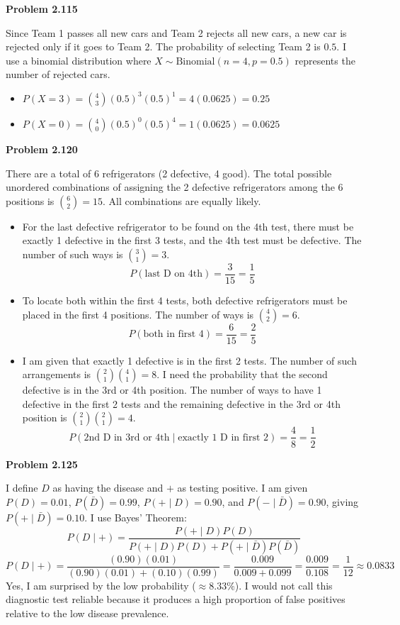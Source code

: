 \documentclass[11pt]{article}
\begin{document}
\textbf{\large Problem 2.115}

Since Team 1 passes all new cars and Team 2 rejects all new cars, a new car is rejected only if it goes to Team 2. The probability of selecting Team 2 is $0.5$. I use a binomial distribution where $X \sim \text{Binomial}(n=4, p=0.5)$ represents the number of rejected cars.
\begin{itemize}
    \item[\textbf{a)}] $P(X = 3) = \binom{4}{3} (0.5)^3 (0.5)^1 = 4(0.0625) = 0.25$
    \item[\textbf{b)}] $P(X = 0) = \binom{4}{0} (0.5)^0 (0.5)^4 = 1(0.0625) = 0.0625$
\end{itemize}

\textbf{\large Problem 2.120}

There are a total of 6 refrigerators (2 defective, 4 good). The total possible unordered combinations of assigning the 2 defective refrigerators among the 6 positions is $\binom{6}{2} = 15$. All combinations are equally likely.
\begin{itemize}
    \item[\textbf{a)}] For the last defective refrigerator to be found on the 4th test, there must be exactly 1 defective in the first 3 tests, and the 4th test must be defective. The number of such ways is $\binom{3}{1} = 3$. 
    \[
    P(\text{last D on 4th}) = \frac{3}{15} = \frac{1}{5}
    \]
    \item[\textbf{b)}] To locate both within the first 4 tests, both defective refrigerators must be placed in the first 4 positions. The number of ways is $\binom{4}{2} = 6$.
    \[
    P(\text{both in first 4}) = \frac{6}{15} = \frac{2}{5}
    \]
    \item[\textbf{c)}] I am given that exactly 1 defective is in the first 2 tests. The number of such arrangements is $\binom{2}{1}\binom{4}{1} = 8$. I need the probability that the second defective is in the 3rd or 4th position. The number of ways to have 1 defective in the first 2 tests and the remaining defective in the 3rd or 4th position is $\binom{2}{1}\binom{2}{1} = 4$.
    \[
    P(\text{2nd D in 3rd or 4th} \mid \text{exactly 1 D in first 2}) = \frac{4}{8} = \frac{1}{2}
    \]
\end{itemize}

\textbf{\large Problem 2.125}

I define $D$ as having the disease and $+$ as testing positive. I am given $P(D) = 0.01$, $P(\bar{D}) = 0.99$, $P(+ \mid D) = 0.90$, and $P(- \mid \bar{D}) = 0.90$, giving $P(+ \mid \bar{D}) = 0.10$. I use Bayes' Theorem:
\[
P(D \mid +) = \frac{P(+ \mid D)P(D)}{P(+ \mid D)P(D) + P(+ \mid \bar{D})P(\bar{D})}
\]
\[
P(D \mid +) = \frac{(0.90)(0.01)}{(0.90)(0.01) + (0.10)(0.99)} = \frac{0.009}{0.009 + 0.099} = \frac{0.009}{0.108} = \frac{1}{12} \approx 0.0833
\]
Yes, I am surprised by the low probability ($\approx 8.33\%$). I would not call this diagnostic test reliable because it produces a high proportion of false positives relative to the low disease prevalence.
\end{document}
